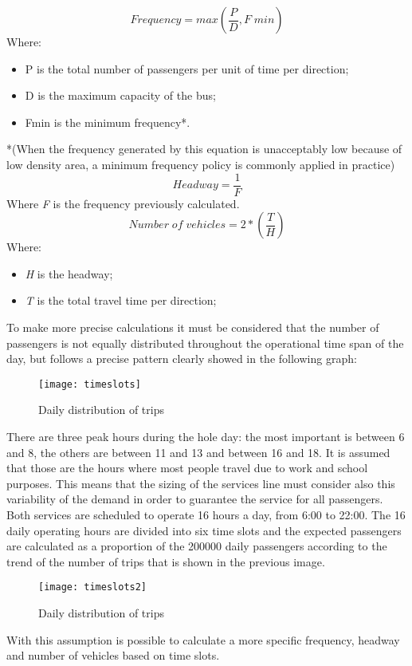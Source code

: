 \documentclass{article}
\begin{document}
\begin{equation}
Frequency=max\left(\frac{P}{D},F\;min\right)
\end{equation} 
Where:
\begin{itemize}
\item P is the total number of passengers per unit of time per direction;
\item D is the maximum capacity of the bus;
\item Fmin is the minimum frequency*.
\end{itemize}
*(When the frequency generated by this equation is unacceptably low because of low density area, a minimum frequency policy is commonly applied in practice)
\begin{equation}
Headway=\frac{1}{F}
\end{equation}
Where \textit{F} is the frequency previously calculated.
\begin{equation}
Number\;of\;vehicles=2*\left(\frac{T}{H}\right)
\end{equation}
Where:
\begin{itemize}
\item \textit{H} is the headway;
\item \textit{T} is the total travel time per direction; 
\end{itemize}
To make more precise calculations it must be considered that the number of passengers is not equally distributed throughout the operational time span of the day, but follows a precise pattern clearly showed in the following graph:

\begin{figure}[H]
\centering
\texttt{[image: timeslots]}
\caption{Daily distribution of trips \cite{japan}}
\end{figure}
There are three peak hours during the hole day: the most important is between 6 and 8, the others are between 11 and 13 and between 16 and 18. It is assumed that those are the hours where most people travel due to work and school purposes. This means that the sizing of the services line must consider also this variability of the demand in order to guarantee the service for all passengers.\\
Both services are scheduled to operate 16 hours a day, from 6:00 to 22:00. The 16 daily operating hours are divided into six time slots and the expected passengers are calculated as a proportion of the 200000 daily passengers according to the trend of the number of trips that is shown in the previous image. 
\begin{figure}[H]
\centering
\texttt{[image: timeslots2]}
\caption{Daily distribution of trips \cite{japan}}
\end{figure}
With this assumption is possible to calculate a more specific frequency, headway and number of vehicles based on time slots. 
\end{document}
